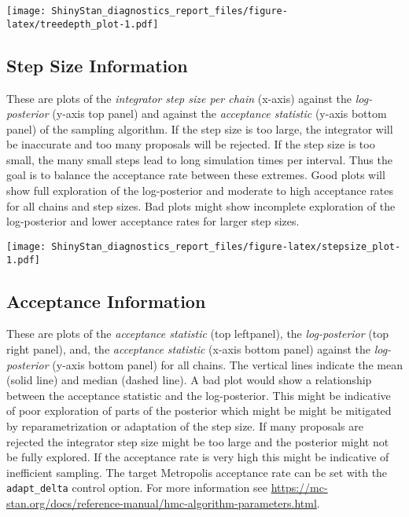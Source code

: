 \documentclass[11pt,]{article}
\begin{document}
\texttt{[image: ShinyStan\_diagnostics\_report\_files/figure-latex/treedepth\_plot-1.pdf]}

\newpage

\hypertarget{step-size-information}{%
\subsection{Step Size Information}\label{step-size-information}}

These are plots of the \emph{integrator step size per chain} (x-axis)
against the \emph{log-posterior} (y-axis top panel) and against the
\emph{acceptance statistic} (y-axis bottom panel) of the sampling
algorithm. If the step size is too large, the integrator will be
inaccurate and too many proposals will be rejected. If the step size is
too small, the many small steps lead to long simulation times per
interval. Thus the goal is to balance the acceptance rate between these
extremes. Good plots will show full exploration of the log-posterior and
moderate to high acceptance rates for all chains and step sizes. Bad
plots might show incomplete exploration of the log-posterior and lower
acceptance rates for larger step sizes.

\texttt{[image: ShinyStan\_diagnostics\_report\_files/figure-latex/stepsize\_plot-1.pdf]}

\newpage

\hypertarget{acceptance-information}{%
\subsection{Acceptance Information}\label{acceptance-information}}

These are plots of the \emph{acceptance statistic} (top leftpanel), the
\emph{log-posterior} (top right panel), and, the \emph{acceptance
statistic} (x-axis bottom panel) against the \emph{log-posterior}
(y-axis bottom panel) for all chains. The vertical lines indicate the
mean (solid line) and median (dashed line). A bad plot would show a
relationship between the acceptance statistic and the log-posterior.
This might be indicative of poor exploration of parts of the posterior
which might be might be mitigated by reparametrization or adaptation of
the step size. If many proposals are rejected the integrator step size
might be too large and the posterior might not be fully explored. If the
acceptance rate is very high this might be indicative of inefficient
sampling. The target Metropolis acceptance rate can be set with the
\texttt{adapt\_delta} control option. For more information see
\url{https://mc-stan.org/docs/reference-manual/hmc-algorithm-parameters.html}.
\end{document}
